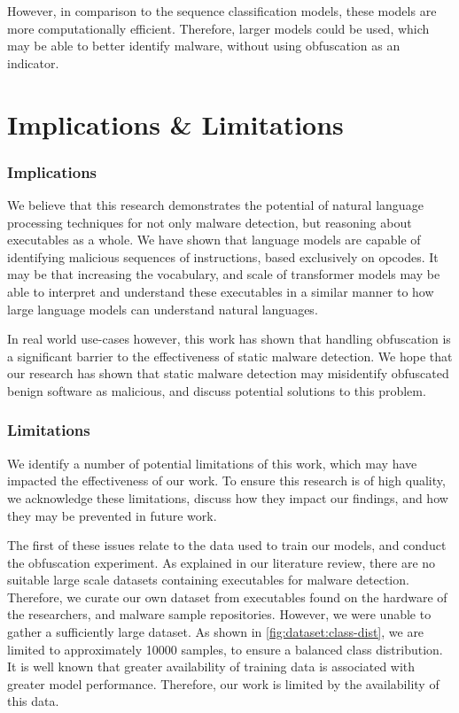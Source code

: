\documentclass[main.tex]{subfiles}
\begin{document}
However, in comparison to the sequence classification models, these models are more computationally efficient. Therefore, larger models could be used, which may be able to better identify malware, without using obfuscation as an indicator. 


\section{Implications \& Limitations}

\subsubsection{Implications}

We believe that this research demonstrates the potential of natural language processing techniques for not only malware detection, but reasoning about executables as a whole. We have shown that language models are capable of identifying malicious sequences of instructions, based exclusively on opcodes. It may be that increasing the vocabulary, and scale of transformer models may be able to interpret and understand these executables in a similar manner to how large language models can understand natural languages. 

In real world use-cases however, this work has shown that handling obfuscation is a significant barrier to the effectiveness of static malware detection. We hope that our research has shown that static malware detection may misidentify obfuscated benign software as malicious, and discuss potential solutions to this problem.

\subsubsection{Limitations}

We identify a number of potential limitations of this work, which may have impacted the effectiveness of our work. To ensure this research is of high quality, we acknowledge these limitations, discuss how they impact our findings, and how they may be prevented in future work. 

The first of these issues relate to the data used to train our models, and conduct the obfuscation experiment. As explained in our literature review, there are no suitable large scale datasets containing executables for malware detection. Therefore, we curate our own dataset from executables found on the hardware of the researchers, and malware sample repositories. However, we were unable to gather a sufficiently large dataset. As shown in \cref{fig:dataset:class-dist}, we are limited to approximately 10000 samples, to ensure a balanced class distribution. It is well known that greater availability of training data is associated with greater model performance. Therefore, our work is limited by the availability of this data. 
\end{document}
